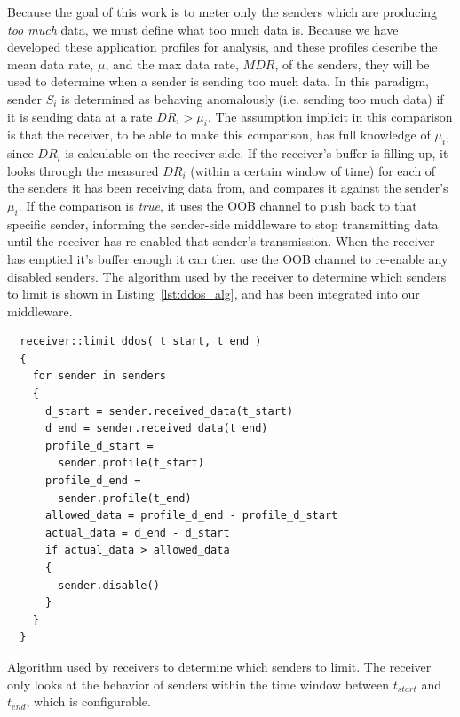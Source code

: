 Because the goal of this work is to meter only the senders which are
producing \emph{too much} data, we must define what too much data is.
Because we have developed these application profiles for analysis, and
these profiles describe the mean data rate, $\mu$, and the max data
rate, $MDR$, of the senders, they will be used to determine when a
sender is sending too much data.  In this paradigm, sender $S_i$ is
determined as behaving anomalously (i.e. sending too much data) if it
is sending data at a rate $DR_i > \mu_i$.  The assumption implicit in
this comparison is that the receiver, to be able to make this
comparison, has full knowledge of $\mu_i$, since $DR_i$ is calculable
on the receiver side.  If the receiver's buffer is filling up, it
looks through the measured $DR_i$ (within a certain window of time)
for each of the senders it has been receiving data from, and compares
it against the sender's $\mu_i$.  If the comparison is \emph{true}, it
uses the OOB channel to push back to that specific sender, informing
the sender-side middleware to stop transmitting data until the
receiver has re-enabled that sender's transmission.  When the receiver
has emptied it's buffer enough it can then use the OOB channel to
re-enable any disabled senders.  The algorithm used by the receiver to
determine which senders to limit is shown in
Listing~\ref{lst:ddos_alg}, and has been integrated into our
middleware.

\begin{listing}[ht!]
  \begin{verbatim}
  receiver::limit_ddos( t_start, t_end )
  {
    for sender in senders
    {
      d_start = sender.received_data(t_start)
      d_end = sender.received_data(t_end)
      profile_d_start =
        sender.profile(t_start)
      profile_d_end =
        sender.profile(t_end)
      allowed_data = profile_d_end - profile_d_start
      actual_data = d_end - d_start
      if actual_data > allowed_data
      {
        sender.disable()
      }
    }
  }
  \end{verbatim}
  \caption{Algorithm used by receivers to determine which senders to
    limit.  The receiver only looks at the behavior of senders within
    the time window between $t_{start}$ and $t_{end}$, which is
    configurable.}
  \label{lst:ddos_alg}
\end{listing}


